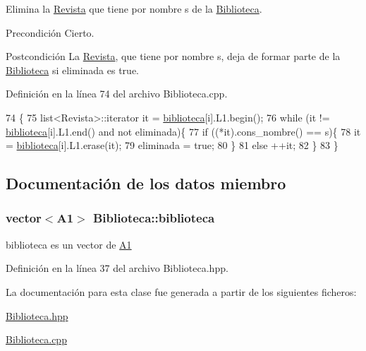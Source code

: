 Elimina la \hyperlink{class_revista}{Revista} que tiene por nombre s de la \hyperlink{class_biblioteca}{Biblioteca}. 

\begin{DoxyPrecond}{Precondición}
Cierto. 
\end{DoxyPrecond}
\begin{DoxyPostcond}{Postcondición}
La \hyperlink{class_revista}{Revista}, que tiene por nombre s, deja de formar parte de la \hyperlink{class_biblioteca}{Biblioteca} si eliminada es true. 
\end{DoxyPostcond}


Definición en la línea 74 del archivo Biblioteca.\-cpp.


\begin{DoxyCode}
74                                                                          \{
75     list<Revista>::iterator it = \hyperlink{class_biblioteca_a83688a3fd707fd8671178e82d7c53f6e}{biblioteca}[i].L1.begin();
76     \textcolor{keywordflow}{while} (it != \hyperlink{class_biblioteca_a83688a3fd707fd8671178e82d7c53f6e}{biblioteca}[i].L1.end() and not eliminada)\{
77   \textcolor{keywordflow}{if} ((*it).cons\_nombre() == s)\{
78       it = \hyperlink{class_biblioteca_a83688a3fd707fd8671178e82d7c53f6e}{biblioteca}[i].L1.erase(it);
79       eliminada = \textcolor{keyword}{true};
80   \}
81   \textcolor{keywordflow}{else} ++it;
82     \}
83 \}
\end{DoxyCode}


\subsection{Documentación de los datos miembro}
\hypertarget{class_biblioteca_a83688a3fd707fd8671178e82d7c53f6e}{
\subsubsection[{biblioteca}]{\setlength{\rightskip}{0pt plus 5cm}vector$<${\bf A1}$>$ Biblioteca\-::biblioteca\hspace{0.3cm}{\ttfamily [private]}}}\label{class_biblioteca_a83688a3fd707fd8671178e82d7c53f6e}


biblioteca es un vector de \hyperlink{struct_biblioteca_1_1_a1}{A1} 



Definición en la línea 37 del archivo Biblioteca.\-hpp.



La documentación para esta clase fue generada a partir de los siguientes ficheros\-:\begin{DoxyCompactItemize}
\item 
\hyperlink{_biblioteca_8hpp}{Biblioteca.\-hpp}\item 
\hyperlink{_biblioteca_8cpp}{Biblioteca.\-cpp}\end{DoxyCompactItemize}
